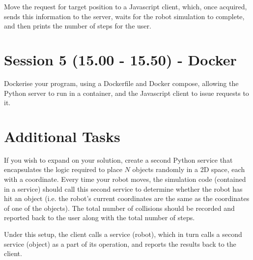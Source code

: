 \documentclass{article}
\begin{document}
Move the request for target position to a Javascript client, which, once acquired, sends this information to the server, waits for the robot simulation to complete, and then prints the number of steps for the user.

\section{Session 5 (15.00 - 15.50) - Docker}

Dockerise your program, using a Dockerfile and Docker compose, allowing the Python server to run in a container, and the Javascript client to issue requests to it.

\section{Additional Tasks}

If you wish to expand on your solution, create a second Python service that encapsulates the logic required to place $N$ objects randomly in a 2D space, each with a coordinate. 
Every time your robot moves, the simulation code (contained in a service) should call this second service to determine whether the robot has hit an object (i.e. the robot's current coordinates are the same as the coordinates of one of the objects).
The total number of collisions should be recorded and reported back to the user along with the total number of steps.

Under this setup, the client calls a service (robot), which in turn calls a second service (object) as a part of its operation, and reports the results back to the client.
\end{document}
